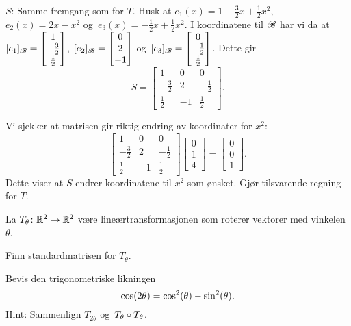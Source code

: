 \begin{losning}
\begin{punkt}
\noindent
$S$: Samme fremgang som for $T$. Husk at $e_1(x)=1-\frac{3}{2}x+\frac{1}{2}x^2$, $e_2(x)=2x-x^2$ og~$e_3(x)=-\frac{1}{2}x+\frac{1}{2}x^2$. I koordinatene til $\mathscr{B}$ har vi da at $[e_1]_{\mathscr{B}}=\begin{bmatrix} 1 \\ -\frac{3}{2} \\ \frac{1}{2} \end{bmatrix}$, $[e_2]_{\mathscr{B}}=\begin{bmatrix} 0 \\ 2 \\ -1 \end{bmatrix}$ og~$[e_3]_{\mathscr{B}}=\begin{bmatrix} 0 \\ -\frac{1}{2} \\ \frac{1}{2} \end{bmatrix}$. Dette gir
$$S=
\begin{bmatrix}
1 & 0 & 0\\
-\frac{3}{2} & 2 & -\frac{1}{2}\\
\frac{1}{2} & -1 & \frac{1}{2}
\end{bmatrix}.$$



\noindent
Vi sjekker at matrisen gir riktig endring av koordinater for $x^2$:
$$
\begin{bmatrix}
1 & 0 & 0\\
-\frac{3}{2} & 2 & -\frac{1}{2}\\
\frac{1}{2} & -1 & \frac{1}{2}
\end{bmatrix}\begin{bmatrix}
0\\
1\\
4
\end{bmatrix}=\begin{bmatrix}
0\\
0\\
1
\end{bmatrix}.$$ Dette viser at $S$ endrer koordinatene til $x^2$ som ønsket. Gjør tilsvarende regning for $T$.

\end{punkt}

\end{losning}



\begin{oppgave}
La $T_\theta \colon \mathbb{R}^2 \to \mathbb{R}^2$ være lineærtransformasjonen som
roterer vektorer med vinkelen $\theta$.

\begin{punkt}
Finn standardmatrisen for $T_\theta$.
\end{punkt}

\begin{punkt}
Bevis den trigonometriske likningen
\vspace{-4pt}
\[
\cos(2\theta)=\cos^2(\theta)-\sin^2 (\theta).
\vspace{-3pt}
\]
Hint: Sammenlign $T_{2\theta}$ og~$T_{\theta} \circ T_{\theta}$.
\end{punkt}


\end{oppgave}

